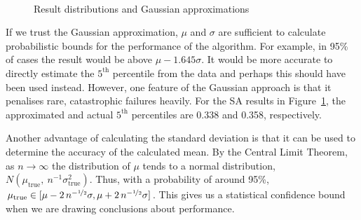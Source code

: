 \documentclass[10pt]{article}
\begin{document}
\begin{figure}
  \begin{center}
    \mbox{
    }
    \end{center}
    \caption{Result distributions and Gaussian approximations}
    \label{fig:result_dist}
    \end{figure}

If we trust the Gaussian approximation, $\mu$ and $\sigma$ are sufficient to
calculate probabilistic bounds for the performance of the algorithm. For
example, in 95\% of cases the result would be above $\mu - 1.645 \sigma$. It
would be more accurate to directly estimate the $5^\textrm{th}$ percentile
from the data and perhaps this should have been used instead. However, one
feature of the Gaussian approach is that it penalises rare, catastrophic
failures heavily.  For the SA results in Figure~\ref{fig:result_dist}, the
approximated and actual $5^\textrm{th}$  percentiles are 0.338 and 0.358,
respectively.

Another advantage of calculating the standard deviation is that it can be used
to determine the accuracy of the calculated mean. By the Central Limit
Theorem, as $n \rightarrow \infty$ the distribution of $\mu$ tends to a normal
distribution, $N(\mu_\textrm{true},\ n^{-1}\sigma_\textrm{true}^2)$. Thus,
with a probability of around 95\%,
$\mu_\textrm{true} \in
[\mu-2\,n^{-\nicefrac{1}{2}}\sigma, \mu+2\,n^{-\nicefrac{1}{2}}\sigma]$. This
gives us a statistical confidence bound when we are drawing conclusions about
performance.
\end{document}
